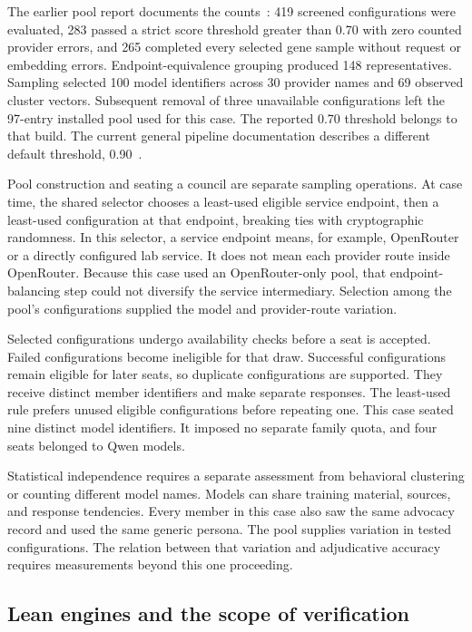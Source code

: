 \documentclass[11pt]{article}
\begin{document}
The earlier pool report documents the counts~\cite{poolpaper}: 419 screened configurations were evaluated, 283 passed a strict score threshold greater than 0.70 with zero counted provider errors, and 265 completed every selected gene sample without request or embedding errors.  Endpoint-equivalence grouping produced 148 representatives.  Sampling selected 100 model identifiers across 30 provider names and 69 observed cluster vectors.  Subsequent removal of three unavailable configurations left the 97-entry installed pool used for this case.  The reported 0.70 threshold belongs to that build.  The current general pipeline documentation describes a different default threshold, 0.90~\cite{poolmanual}.

Pool construction and seating a council are separate sampling operations.  At case time, the shared selector chooses a least-used eligible service endpoint, then a least-used configuration at that endpoint, breaking ties with cryptographic randomness.  In this selector, a service endpoint means, for example, OpenRouter or a directly configured lab service.  It does not mean each provider route inside OpenRouter.  Because this case used an OpenRouter-only pool, that endpoint-balancing step could not diversify the service intermediary.  Selection among the pool's configurations supplied the model and provider-route variation.

Selected configurations undergo availability checks before a seat is accepted.  Failed configurations become ineligible for that draw.  Successful configurations remain eligible for later seats, so duplicate configurations are supported.  They receive distinct member identifiers and make separate responses.  The least-used rule prefers unused eligible configurations before repeating one.  This case seated nine distinct model identifiers.  It imposed no separate family quota, and four seats belonged to Qwen models.

Statistical independence requires a separate assessment from behavioral clustering or counting different model names.  Models can share training material, sources, and response tendencies.  Every member in this case also saw the same advocacy record and used the same generic persona.  The pool supplies variation in tested configurations.  The relation between that variation and adjudicative accuracy requires measurements beyond this one proceeding.

\subsection{Lean engines and the scope of verification}
\label{sec:lean}
\end{document}
